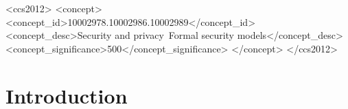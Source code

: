 \documentclass[utf8,acmsmall,review,screen,dvipsnames,anonymous]{acmart}
\begin{document}
\begin{CCSXML}
<ccs2012>
  <concept>
  <concept_id>10002978.10002986.10002989</concept_id>
  <concept_desc>Security and privacy~Formal security models</concept_desc>
  <concept_significance>500</concept_significance>
  </concept>
</ccs2012>
\end{CCSXML}


\maketitle

\section{Introduction}\label{sec:introduction}

\end{document}
